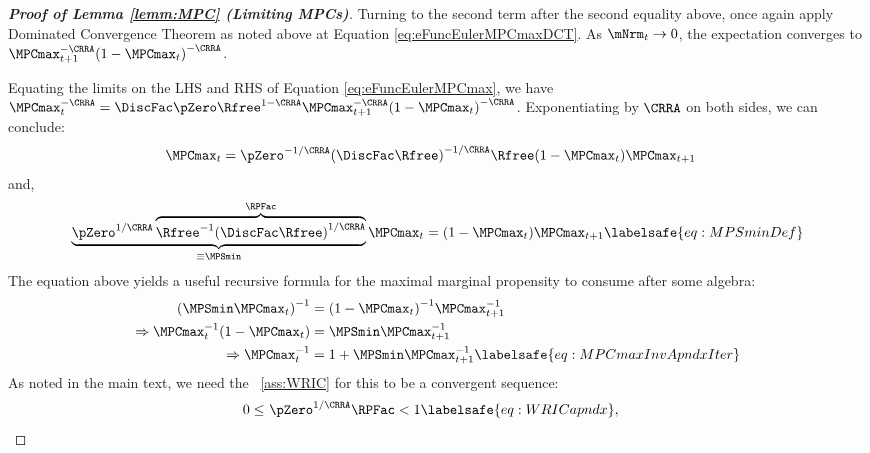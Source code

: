 \documentclass[\econtexRoot/BufferStockTheory]{subfiles}
\begin{document}
\begin{proof}[\textbf{Proof of Lemma \ref{lemm:MPC} (Limiting MPCs)}]
Turning to the second term after the second equality above, once again apply Dominated Convergence Theorem as noted above at Equation \eqref{eq:eFuncEulerMPCmaxDCT}.
As $\mNrm_{t} \rightarrow 0$, 
the expectation converges to $\MPCmax _{t+1}^{-\CRRA
}{(1-\MPCmax _{t})}^{-\CRRA }$.


Equating the limits on the LHS and RHS of Equation \eqref{eq:eFuncEulerMPCmax}, we have $\MPCmax_{t}^{-\CRRA }=\DiscFac
\pZero\Rfree^{1-\CRRA }\MPCmax_{t+1}^{-\CRRA }{(1-\MPCmax
_{t})}^{-\CRRA }$.
Exponentiating by $\CRRA$ on both sides, we can conclude:
%
%
\begin{equation}\begin{gathered}\begin{aligned}
\MPCmax_{t} & = \pZero^{-1/\CRRA} {(\DiscFac
\Rfree)}^{-1/\CRRA}\Rfree(1-\MPCmax _{t})\MPCmax _{t+1} \notag
\end{aligned}\end{gathered}\end{equation}
%
%
and, 
%
%
\begin{equation}
 \underbrace{\pZero^{1/\CRRA}\overbrace{{\Rfree}^{-1}{(\DiscFac
    \Rfree)}^{1/\CRRA}}^{\RPFac}}_{\equiv \MPSmin} \MPCmax_{t}  = (1-\MPCmax _{t})\MPCmax _{t+1} \labelsafe{eq:MPSminDef}
\end{equation}
%
%
The equation above yields a useful recursive formula for the maximal marginal propensity to consume after some algebra:
%
%
\begin{equation}\begin{gathered}\begin{aligned}
  {(\MPSmin \MPCmax_{t})}^{-1}  & = {(1-\MPCmax_{t})}^{-1}\MPCmax_{t+1}^{-1}  \notag
\\ \Rightarrow \MPCmax_{t}^{-1}(1-\MPCmax_{t})  & = \MPSmin \MPCmax_{t+1}^{-1}   \notag
\\ \Rightarrow  \MPCmax_{t}^{-1}  & = 1+\MPSmin \MPCmax_{t+1}^{-1} \labelsafe{eq:MPCmaxInvApndxIter}
\end{aligned}\end{gathered}\end{equation}
%
%
As noted in the main text, we need the \WRIC~\ref{ass:WRIC} for this to be a convergent sequence:
\begin{equation}\begin{gathered}\begin{aligned}
  0 \leq & ~\pZero^{1/\CRRA} \RPFac < 1 \labelsafe{eq:WRICapndx},
\end{aligned}\end{gathered}\end{equation}


\end{proof}
\end{document}
